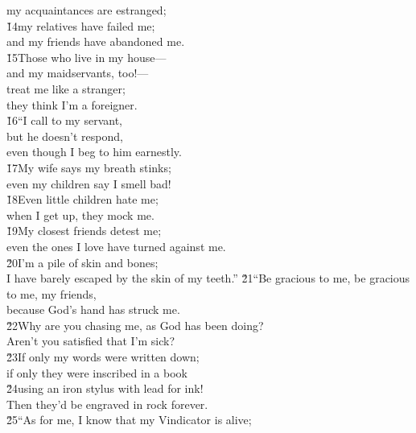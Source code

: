 \begin{poetry}
\poemll    my acquaintances are estranged; \\
\poeml \v{14}my relatives have failed me; \\
\poemll    and my friends have abandoned me. \\
\poeml \v{15}Those who live in my house--- \\
\poemll    and my maidservants, too!--- \\
\poeml treat me like a stranger; \\
\poemll    they think I'm a foreigner. \\
\poeml \v{16}``I call to my servant, \\
\poemll    but he doesn't respond, \\
\poemlll       even though I beg to him earnestly. \\
\poeml \v{17}My wife says my breath stinks; \\
\poemll    even my children say I smell bad! \\
\poeml \v{18}Even little children hate me; \\
\poemll    when I get up, they mock me. \\
\poeml \v{19}My closest friends detest me; \\
\poemll    even the ones I love have turned against me. \\
\poeml \v{20}I'm a pile of skin and bones; \\
\poemll    I have barely escaped by the skin of my teeth.''
\poeml \v{21}``Be gracious to me, be gracious to me, my friends, \\
\poemll    because God's hand has struck me. \\
\poeml \v{22}Why are you chasing me, as God has been doing? \\
\poemll    Aren't you satisfied that I'm sick? \\
\poeml \v{23}If only my words were written down; \\
\poemll    if only they were inscribed in a book \\
\poeml \v{24}using an iron stylus with lead for ink! \\
\poemll    Then they'd be engraved in rock forever. \\
\poeml \v{25}``As for me, I know that my Vindicator is alive; \\

\end{poetry}
